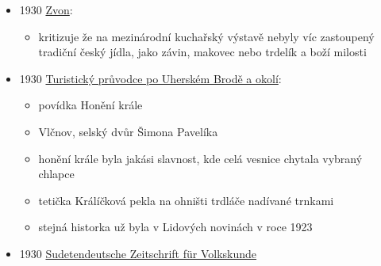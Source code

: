 \begin{itemize}
\begin{itemize}
\begin{itemize}
      \begin{itemize}
      \tightlist
      \item
        pečenej na ohni, při tom se maže mlíkem a sype perníkem a
        cukrem. po opečení se potíral medem
      \item
        na Slavičínsku se nosí trdláče z řidšího těsta sypaný mákem
      \end{itemize}
    \end{itemize}
  \item
    s. 318:

    \begin{itemize}
    \tightlist
    \item
      co se dává šestinedělkám
    \item
      v Biskupicích trdláče
    \end{itemize}
  \end{itemize}
\item
  1930
  \href{https://ceskadigitalniknihovna.cz/view/uuid:962edf50-9004-11e3-83a0-005056825209?page=uuid\%3Ac58d1770-9613-11e3-8b69-005056825209&fulltext=trdeln\%C3\%ADk\%20OR\%20trdeln\%C3\%ADky\%20OR\%20trdeln\%C3\%ADk\%C5\%AF&source=mzk}{Zvon}:

  \begin{itemize}
  \tightlist
  \item
    kritizuje že na mezinárodní kuchařský výstavě nebyly víc zastoupený
    tradiční český jídla, jako závin, makovec nebo trdelík a boží
    milosti
  \end{itemize}
\item
  1930
  \href{https://ceskadigitalniknihovna.cz/uuid/uuid:0ef229ae-ef9e-4c80-b6ca-8a7a99a85b67}{Turistický
  průvodce po Uherském Brodě a okolí}:

  \begin{itemize}
  \tightlist
  \item
    povídka Honění krále
  \item
    Vlčnov, selský dvůr Šimona Pavelíka
  \item
    honění krále byla jakási slavnost, kde celá vesnice chytala vybraný
    chlapce
  \item
    tetička Králíčková pekla na ohništi trdláče nadívané trnkami
  \item
    stejná historka už byla v Lidových novinách v roce 1923
  \end{itemize}
\item
  1930
  \href{https://ceskadigitalniknihovna.cz/uuid/uuid:c691a682-5723-11ee-b168-005056841fbb}{Sudetendeutsche
  Zeitschrift für Volkskunde}


\end{itemize}
